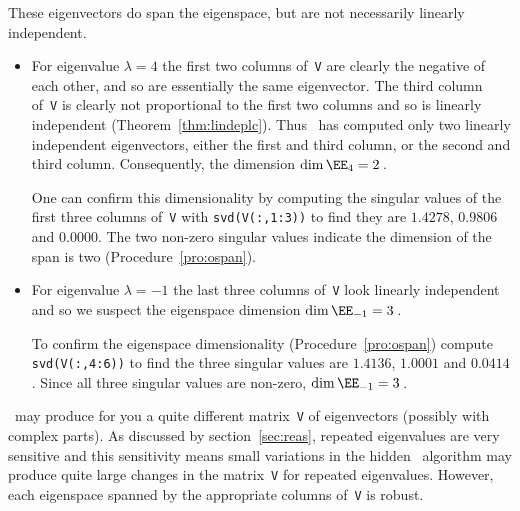 \begin{example}
\begin{solution}
These eigenvectors do span the eigenspace, but are not necessarily linearly independent.
\begin{itemize}
\item For eigenvalue \(\lambda=4\) the first two columns of~\verb|V| are clearly the negative of each other, and so are essentially the same eigenvector.  
The third column of~\verb|V| is clearly not proportional to the first two columns and so is linearly independent (Theorem~\ref{thm:lindeplc}).
Thus \script\ has computed only two linearly independent eigenvectors, either the first and third column, or the second and third column.
Consequently, the dimension \(\dim\EE_4=2\)\,.

One can confirm this dimensionality by computing the singular values of the first three columns of~\verb|V| with \verb|svd(V(:,1:3))| to find they are \(1.4278\), \(0.9806\) and \(0.0000\).
The two non-zero singular values indicate the dimension of the span is two (Procedure~\ref{pro:ospan}).

\item For eigenvalue \(\lambda=-1\) the last three columns of~\verb|V| look linearly independent and so we suspect the eigenspace dimension \(\dim\EE_{-1}=3\)\,.

To confirm the eigenspace dimensionality (Procedure~\ref{pro:ospan}) compute \verb|svd(V(:,4:6))| to find the three singular values are \(1.4136\), \(1.0001\) and \(0.0414\).
Since all three singular values are non-zero, \(\dim\EE_{-1}=3\)\,.
\end{itemize}
\end{solution}
\script\ may produce for you a quite different matrix~\verb|V| of eigenvectors (possibly with complex parts). 
As discussed by section~\ref{sec:reas}, repeated eigenvalues are very sensitive and this sensitivity means small variations in the hidden \script\ algorithm may produce quite large changes in the matrix~\verb|V| for repeated eigenvalues.
However, each eigenspace spanned by the appropriate columns of~\verb|V| is robust.
\end{example}





